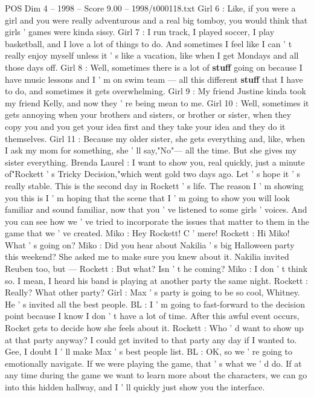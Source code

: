 \begin{textsample}{POS Dim 4 – 1998 – Score 9.00 – 1998/t000118.txt}
Girl 6 : Like, if you were a girl and you were really adventurous and a real big tomboy, you would think that girls ' games were kinda sissy.
Girl 7 : I run track, I played soccer, I play basketball, and I love a lot of things to do.
And sometimes I feel like I can ' t really enjoy myself unless it ' s like a vacation, like when I get Mondays and all those days off.
Girl 8 : Well, sometimes there is a lot of \textbf{stuff} going on because I have music lessons and I ' m on swim team — all this different \textbf{stuff} that I have to do, and sometimes it gets overwhelming.
Girl 9 : My friend Justine kinda took my friend Kelly, and now they ' re being mean to me.
Girl 10 : Well, sometimes it gets annoying when your brothers and sisters, or brother or sister, when they copy you and you get your idea first and they take your idea and they do it themselves.
Girl 11 : Because my older sister, she gets everything and, like, when I ask my mom for something, she ' ll say,"No"— all the time.
But she gives my sister everything.
Brenda Laurel : I want to show you, real quickly, just a minute of"Rockett ' s Tricky Decision,"which went gold two days ago.
Let ' s hope it ' s really stable.
This is the second day in Rockett ' s life.
The reason I ' m showing you this is I ' m hoping that the scene that I ' m going to show you will look familiar and sound familiar, now that you ' ve listened to some girls ' voices.
And you can see how we ' ve tried to incorporate the issues that matter to them in the game that we ' ve created.
Miko : Hey Rockett!
C ' mere!
Rockett : Hi Miko!
What ' s going on?
Miko : Did you hear about Nakilia ' s big Halloween party this weekend?
She asked me to make sure you knew about it.
Nakilia invited Reuben too, but — Rockett : But what?
Isn ' t he coming?
Miko : I don ' t think so.
I mean, I heard his band is playing at another party the same night.
Rockett : Really?
What other party?
Girl : Max ' s party is going to be so cool, Whitney.
He ' s invited all the best people.
BL : I ' m going to fast-forward to the decision point because I know I don ' t have a lot of time.
After this awful event occurs, Rocket gets to decide how she feels about it.
Rockett : Who ' d want to show up at that party anyway?
I could get invited to that party any day if I wanted to.
Gee, I doubt I ' ll make Max ' s best people list.
BL : OK, so we ' re going to emotionally navigate.
If we were playing the game, that ' s what we ' d do.
If at any time during the game we want to learn more about the characters, we can go into this hidden hallway, and I ' ll quickly just show you the interface.

\end{textsample}
